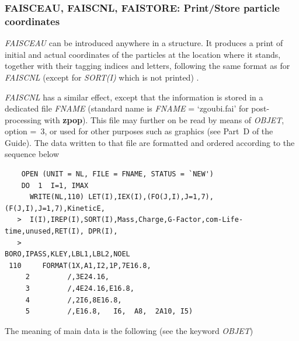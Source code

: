 \newpage

\subsubsection*{FAISCEAU, FAISCNL, FAISTORE:  Print/Store particle coordinates} \label{FAISCEAU}\label{FAISCNL}
 \label{FAISTORE} 


\textsl{FAISCEAU}  can be introduced anywhere in a structure.  It produces a print 
of  initial and actual coordinates of the particles at the location where it stands, together with their 
tagging indices and letters, following the same format as for \textsl{FAISCNL} (except 
for \textsl{SORT(I)}   which is not printed) .  
\bigskip

\noindent\textsl{FAISCNL} has a similar effect, except that the information is stored in a 
dedicated file \textsl{FNAME} (standard name is \textsl{FNAME} = `zgoubi.fai' 
for post-processing with \textbf{zpop}).  This file may further on be read by means of  \textsl{OBJET}, 
option \mbox{\KOBJ= 3}, or used for other purposes such as graphics (see Part~D of the Guide).  The data written to that file are formatted and  ordered 
according to the \FORTRAN sequence below

{\footnotesize
\begin{verbatim}
    OPEN (UNIT = NL, FILE = FNAME, STATUS = `NEW')
    DO  1  I=1, IMAX
      WRITE(NL,110) LET(I),IEX(I),(FO(J,I),J=1,7),(F(J,I),J=1,7),KineticE,
   >  I(I),IREP(I),SORT(I),Mass,Charge,G-Factor,com-Life-time,unused,RET(I), DPR(I),
   >                                      BORO,IPASS,KLEY,LBL1,LBL2,NOEL
 110     FORMAT(1X,A1,I2,1P,7E16.8,
     2         /,3E24.16,
     3         /,4E24.16,E16.8,
     4         /,2I6,8E16.8,
     5         /,E16.8,   I6,  A8,  2A10, I5)
\end{verbatim}}
\medskip

\noindent The meaning of main data is the following (see the keyword \textsl{OBJET})
\bigskip


